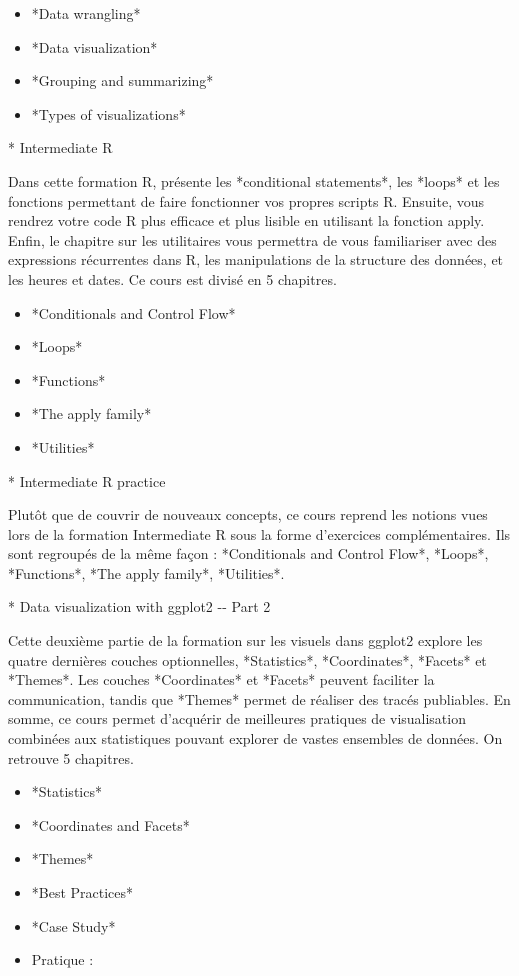 \documentclass[
  letterpaper,
]{scrbook}
\begin{document}
\begin{itemize}
\item
  *Data wrangling*
\item
  *Data visualization*
\item
  *Grouping and summarizing*
\item
  *Types of visualizations*
\end{itemize}

* Intermediate R

Dans cette formation R, présente les *conditional statements*, les
*loops* et les fonctions permettant de faire fonctionner vos propres
scripts R. Ensuite, vous rendrez votre code R plus efficace et plus
lisible en utilisant la fonction apply. Enfin, le chapitre sur les
utilitaires vous permettra de vous familiariser avec des expressions
récurrentes dans R, les manipulations de la structure des données, et
les heures et dates. Ce cours est divisé en 5 chapitres.

\begin{itemize}
\item
  *Conditionals and Control Flow*
\item
  *Loops*
\item
  *Functions*
\item
  *The apply family*
\item
  *Utilities*
\end{itemize}

* Intermediate R practice

Plutôt que de couvrir de nouveaux concepts, ce cours reprend les notions
vues lors de la formation Intermediate R sous la forme d'exercices
complémentaires. Ils sont regroupés de la même façon : *Conditionals and
Control Flow*, *Loops*, *Functions*, *The apply family*, *Utilities*.

* Data visualization with ggplot2 -\/- Part 2

Cette deuxième partie de la formation sur les visuels dans ggplot2
explore les quatre dernières couches optionnelles, *Statistics*,
*Coordinates*, *Facets* et *Themes*. Les couches *Coordinates* et
*Facets* peuvent faciliter la communication, tandis que *Themes* permet
de réaliser des tracés publiables. En somme, ce cours permet d'acquérir
de meilleures pratiques de visualisation combinées aux statistiques
pouvant explorer de vastes ensembles de données. On retrouve 5
chapitres.

\begin{itemize}
\item
  *Statistics*
\item
  *Coordinates and Facets*
\item
  *Themes*
\item
  *Best Practices*
\item
  *Case Study*
\item
  Pratique :
\end{itemize}
\end{document}
